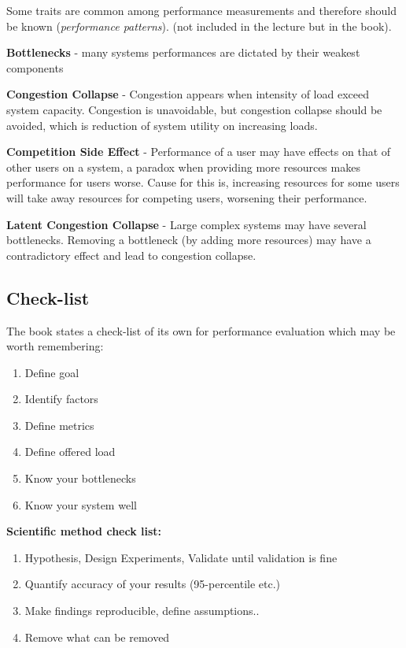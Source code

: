 Some traits are common among performance measurements and therefore should be known (\textit{performance patterns}). (not included in the lecture but in the book).

\textbf{Bottlenecks} - many systems performances are dictated by their weakest components

\textbf{Congestion Collapse} - Congestion appears when intensity of load exceed system capacity. Congestion is unavoidable, but congestion collapse should be avoided, which is reduction of system utility on increasing loads.

\textbf{Competition Side Effect} - Performance of a user may have effects on that of other users on a system, a paradox when providing more resources makes performance for users worse. Cause for this is, increasing resources for some users will take away resources for competing users, worsening their performance.

\textbf{Latent Congestion Collapse} - Large complex systems may have several bottlenecks. Removing a bottleneck (by adding more resources) may have a contradictory effect and lead to congestion collapse.

\subsection{Check-list}

The book states a check-list of its own for performance evaluation which may be worth remembering:

\begin{enumerate}
    \item Define goal
    \item Identify factors
    \item Define metrics
    \item Define offered load
    \item Know your bottlenecks
    \item Know your system well
\end{enumerate}

\textbf{Scientific method check list:}

\begin{enumerate}
    \item Hypothesis, Design Experiments, Validate until validation is fine
    \item Quantify accuracy of your results (95-percentile etc.)
    \item Make findings reproducible, define assumptions..
    \item Remove what can be removed
\end{enumerate}

